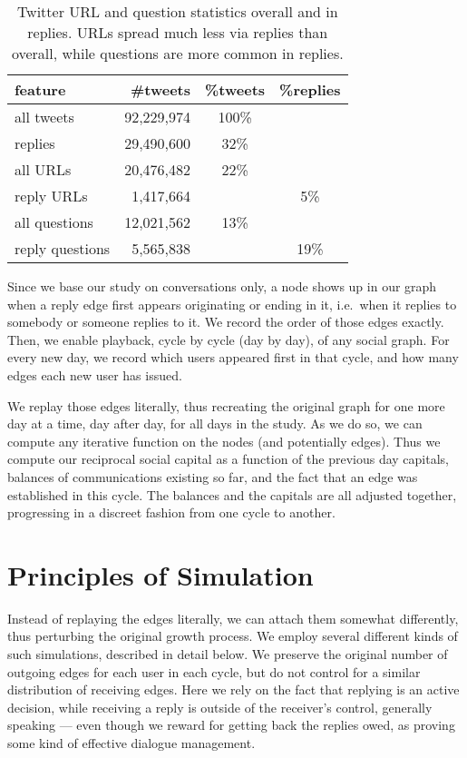 \documentclass[10pt,oneside]{memoir}
\begin{document}
\begin{table}
\begin{tabular}{|lrcc|}
\toprule
feature & \#tweets & \%tweets & \%replies \\
\midrule
all tweets & 92,229,974 & 100\% & \space\\
replies & 29,490,600 & 32\% & \space \\
all URLs & 20,476,482 &  22\% & \space \\
reply URLs & 1,417,664 & \space & 5\% \\
all questions & 12,021,562 & 13\% & \space \\
reply questions & 5,565,838 & \space & 19\% \\
\bottomrule
\end{tabular}
\label{table:reply-stats}
\caption{Twitter URL and question statistics overall and in replies.  URLs spread much less via replies than overall, while questions are more common in replies.}
\end{table}
Since we base our study on conversations only, a node shows up in our graph when a reply edge first appears originating or ending in it, i.e.\ when it replies to somebody or someone replies to it.  We record the order of those edges exactly.
Then, we enable playback, cycle by cycle (day by day), of any social graph.  For every new day, we record which users appeared first in that cycle, and how many edges each new user has issued.


We replay those edges literally, thus recreating the original graph for one more day at a time, day after day, for all days in the study.  As we do so, we can compute any iterative function on the nodes (and potentially edges).  Thus we compute our reciprocal social capital as a function of the previous day capitals, balances of communications existing so far, and the fact that an edge was established in this cycle.  The balances and the capitals are all adjusted together, progressing in a discreet fashion from one cycle to another.


\pagebreak \section{Principles of Simulation}
\label{principlesofsimulation}

Instead of replaying the edges literally, we can attach them somewhat differently, thus perturbing the original growth process.  We employ several different kinds of such simulations, described in detail below.  We preserve the original number of outgoing edges for each user in each cycle, but do not control for a similar distribution of receiving edges.  Here we rely on the fact that replying is an active decision, while receiving a reply is outside of the receiver's control, generally speaking --- even though we reward for getting back the replies owed, as proving some kind of effective dialogue management.
\end{document}
